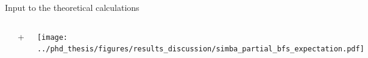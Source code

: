 \documentclass[xcolor=dvipsnames]{beamer}
\begin{document}
\begin{frame}{Input to the theoretical calculations}
\centering\scriptsize
\begin{columns}
   \centering
   \centering\scriptsize

   \includegraphics[width=0.45\textwidth]{figures/babar_hadtag_spec_default_la055_a3.pdf}
   \includegraphics[width=0.45\textwidth]{figures/babar_incl_spec_default_la055_a3.pdf}
   \includegraphics[width=0.45\textwidth]{figures/babar_sem_spec_default_la055_a3.pdf}
   \includegraphics[width=0.45\textwidth]{figures/belle_spec_default_la055_a3.pdf}
   
   {\Large +}
   
   \texttt{[image: ../phd\_thesis/figures/results\_discussion/simba\_partial\_bfs\_expectation.pdf]}


\end{columns}
\end{frame}
\end{document}
